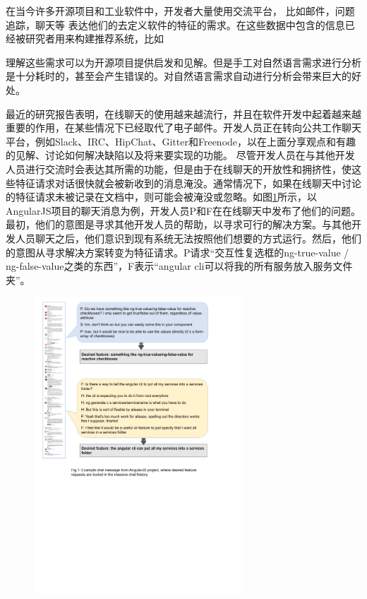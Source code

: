 在当今许多开源项目和工业软件中，开发者大量使用交流平台， 比如邮件，问题追踪，聊天等 \cite{panichella2014developers}表达他们的去定义软件的特征的需求\cite{fitzgerald2006transformation}。在这些数据中包含的信息已经被研究者用来构建推荐系统，比如

理解这些需求可以为开源项目提供启发和见解。但是手工对自然语言需求进行分析是十分耗时的，甚至会产生错误的。对自然语言需求自动进行分析会带来巨大的好处。

最近的研究报告表明，在线聊天的使用越来越流行，并且在软件开发中起着越来越重要的作用，在某些情况下已经取代了电子邮件。开发人员正在转向公共工作聊天平台，例如Slack、IRC、HipChat、Gitter和Freenode，以在上面分享观点和有趣的见解、讨论如何解决缺陷以及将来要实现的功能。
尽管开发人员在与其他开发人员进行交流时会表达其所需的功能，但是由于在线聊天的开放性和拥挤性，使这些特征请求对话很快就会被新收到的消息淹没。通常情况下，如果在线聊天中讨论的特征请求未被记录在文档中，则可能会被淹没或忽略。如图\ref{fig:motivation}所示，以AngularJS项目的聊天消息为例，开发人员P和F在在线聊天中发布了他们的问题。最初，他们的意图是寻求其他开发人员的帮助，以寻求可行的解决方案。与其他开发人员聊天之后，他们意识到现有系统无法按照他们想要的方式运行。然后，他们的意图从寻求解决方案转变为特征请求。P请求“交互性复选框的ng-true-value / ng-false-value之类的东西”，F表示“angular cli可以将我的所有服务放入服务文件夹”。
\begin{figure}[htbp]
    \centering
    \includegraphics[width=0.70\textwidth]{Img/motivation.pdf}
    \label{fig:motivation}
\end{figure}

